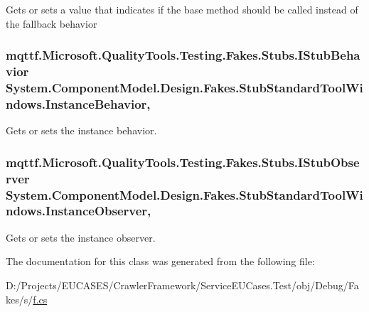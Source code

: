 Gets or sets a value that indicates if the base method should be called instead of the fallback behavior

\hypertarget{class_system_1_1_component_model_1_1_design_1_1_fakes_1_1_stub_standard_tool_windows_ad37cc28c6b4e18313d970ed9cab45630}{
\subsubsection[{Instance\-Behavior}]{\setlength{\rightskip}{0pt plus 5cm}mqttf.\-Microsoft.\-Quality\-Tools.\-Testing.\-Fakes.\-Stubs.\-I\-Stub\-Behavior System.\-Component\-Model.\-Design.\-Fakes.\-Stub\-Standard\-Tool\-Windows.\-Instance\-Behavior\hspace{0.3cm}{\ttfamily [get]}, {\ttfamily [set]}}}\label{class_system_1_1_component_model_1_1_design_1_1_fakes_1_1_stub_standard_tool_windows_ad37cc28c6b4e18313d970ed9cab45630}


Gets or sets the instance behavior.

\hypertarget{class_system_1_1_component_model_1_1_design_1_1_fakes_1_1_stub_standard_tool_windows_ad6e89311ae3e844b5fde700754e2d25d}{
\subsubsection[{Instance\-Observer}]{\setlength{\rightskip}{0pt plus 5cm}mqttf.\-Microsoft.\-Quality\-Tools.\-Testing.\-Fakes.\-Stubs.\-I\-Stub\-Observer System.\-Component\-Model.\-Design.\-Fakes.\-Stub\-Standard\-Tool\-Windows.\-Instance\-Observer\hspace{0.3cm}{\ttfamily [get]}, {\ttfamily [set]}}}\label{class_system_1_1_component_model_1_1_design_1_1_fakes_1_1_stub_standard_tool_windows_ad6e89311ae3e844b5fde700754e2d25d}


Gets or sets the instance observer.



The documentation for this class was generated from the following file\-:\begin{DoxyCompactItemize}
\item 
D\-:/\-Projects/\-E\-U\-C\-A\-S\-E\-S/\-Crawler\-Framework/\-Service\-E\-U\-Cases.\-Test/obj/\-Debug/\-Fakes/s/\hyperlink{s_2f_8cs}{f.\-cs}\end{DoxyCompactItemize}
